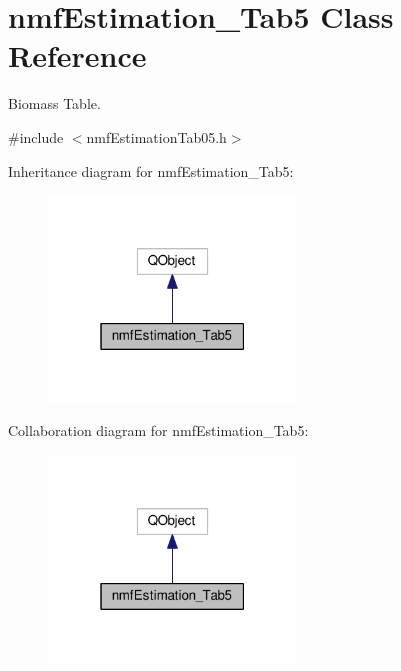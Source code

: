 \hypertarget{classnmf_estimation___tab5}{}\section{nmf\+Estimation\+\_\+\+Tab5 Class Reference}
\label{classnmf_estimation___tab5}


Biomass Table.  




{\ttfamily \#include $<$nmf\+Estimation\+Tab05.\+h$>$}



Inheritance diagram for nmf\+Estimation\+\_\+\+Tab5\+:\nopagebreak
\begin{figure}[H]
\begin{center}
\leavevmode
\includegraphics[width=187pt]{classnmf_estimation___tab5__inherit__graph}
\end{center}
\end{figure}


Collaboration diagram for nmf\+Estimation\+\_\+\+Tab5\+:\nopagebreak
\begin{figure}[H]
\begin{center}
\leavevmode
\includegraphics[width=187pt]{classnmf_estimation___tab5__coll__graph}
\end{center}
\end{figure}
